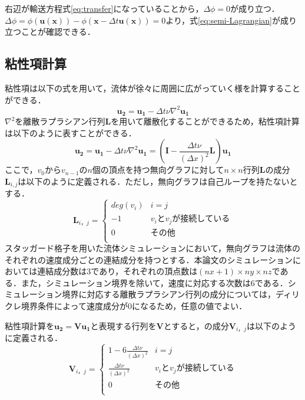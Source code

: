 \documentclass[a4j,12pt]{jreport}
\begin{document}
 右辺が輸送方程式\ref{eq:transfer}になっていることから，$ \varDelta \phi =0$が成り立つ．
$\varDelta \phi = \phi( \bm{u} (\bm{x})) - \phi (\bm{x} - \varDelta t\bm{u} (\bm{x}))= 0$より，式\ref{eq:semi-Lagrangian}が成り立つことが確認できる．
\subsection{粘性項計算}
粘性項は以下の式を用いて，流体が徐々に周囲に広がっていく様を計算することができる．
\[
\bm{u_2}   =  \bm{u_1} - \varDelta t \nu\nabla^2\bm{u_1}
\]
$\nabla^2$を離散ラプラシアン行列$\bm{L}$を用いて離散化することができるため，粘性項計算は以下のように表すことができる．
\begin{equation}\label{eq:discrete Laplacian}
	\bm{u_2}   =  \bm{u_1} - \varDelta t \nu\nabla^2\bm{u_1} = (\bm{I} -  \frac{\varDelta t \nu}{(\varDelta x)^2}\bm{L})\bm{u_1}
\end{equation}
ここで，$v_0$から$v_{n-1}$の$n$個の頂点を持つ無向グラフに対して$n \times n$行列$\bm{L}$の成分$\bm{L}_{i,j}$は以下のように定義される．ただし，無向グラフは自己ループを持たないとする．
\[
	\bm{L}_{i，j} = \begin{cases}
 	deg(v_i) 	& i = j\\
 	-1  		& v_iとv_jが接続している\\
 	0  		& その他\\
 \end{cases}
\]
スタッガード格子を用いた流体シミュレーションにおいて，無向グラフは流体のそれぞれの速度成分ごとの連結成分を持つとする．本論文のシミュレーションにおいては連結成分数は3であり，それぞれの頂点数は$(nx+1) \times ny \times nz$である．また，シミュレーション境界を除いて，速度に対応する次数は$6$である．シミュレーション境界に対応する離散ラプラシアン行列の成分については，ディリクレ境界条件によって速度成分が$0$になるため，任意の値でよい．

粘性項計算を$\bm{u_2}   =  \bm{V}\bm{u_1}$と表現する行列を$\bm{V}$とすると，の成分$\bm{V}_{i，j}$は以下のように定義される．
 \[
 	\bm{V}_{i，j}  = \begin{cases}
 	1 - 6 \frac{\varDelta t \nu}{(\varDelta x)^2} 	& i = j\\
 	 \frac{\varDelta t \nu}{(\varDelta x)^2}  	& v_iとv_jが接続している\\
 	0  				& その他\\
	 \end{cases}
\]
\end{document}
